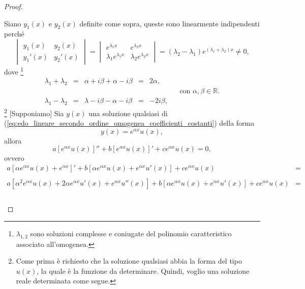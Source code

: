 \begin{proof}
\begin{enumerate}
		\noindent Siano $y_1(x)$ e $y_2(x)$ definite come sopra, queste sono linearmente indipendenti perché
		\begin{equation*}
				\begin{vmatrix}
				y_1(x) & y_2(x)\\
				y_1'(x) & y_2'(x)
			\end{vmatrix} = 
			\begin{vmatrix}
				e^{\lambda_1x} & e^{\lambda_2 x}\\
				\lambda_1 e^{\lambda_1x} & \lambda_2 e^{\lambda_2 x}
			\end{vmatrix} = (\lambda_2 -\lambda_1) e^{(\lambda_1+\lambda_2)x}\neq 0,
		\end{equation*}
		dove \footnote{$\lambda_{1,2}$ sono soluzioni complesse e coniugate del polinomio caratteristico associato all'omogenea.}
		\begin{equation*}
			\begin{matrix}
				\lambda_1 + \lambda_2 &=& \alpha + i\beta + \alpha - i\beta &=& 2 \alpha,\\
				&&&&&&\text{con } \alpha,\beta\in\mathbb{R}.\\
				\lambda_1 - \lambda_2 &=& \lambda - i\beta - \alpha - i\beta &=& - 2i\beta,
			\end{matrix}
		\end{equation*}
		\footnote{Come prima è richiesto che la soluzione qualsiasi abbia la forma del tipo $u(x)$, la quale è la funzione da determinare. Quindi, voglio una soluzione reale determinata come segue.} [Supponiamo] Sia $y(x)$ una soluzione qualsiasi di (\ref{eq:edo_lineare_secondo_ordine_omogenea_coefficienti_costanti}) della forma
		\begin{equation*}
			y(x) = e^{\alpha x} u(x),
		\end{equation*}
		allora
		\begin{equation*}
				a[e^{\alpha x} u(x)]'' + b [e^{\alpha x} u(x)]' + c e^{\alpha x} u(x) = 0,
		\end{equation*}
		ovvero
		\begin{equation*}
			\begin{matrix}
				a [\alpha e^{\alpha x}u(x) + e^{\alpha x}]' + b [\alpha e^{\alpha x}u(x) + e^{\alpha x}u'(x)] + c e^{\alpha x}u(x)&=&\\\\
				a[\alpha^2e^{\alpha x}u(x) + 2\alpha e^{\alpha x} u'(x) + e^{\alpha x}u''(x)] + b [\alpha e^{\alpha x}u(x) + e^{\alpha x}u'(x)] + c e^{\alpha x}u(x) &=&\\\\

\end{matrix}
\end{equation*}
\end{enumerate}
\end{proof}
